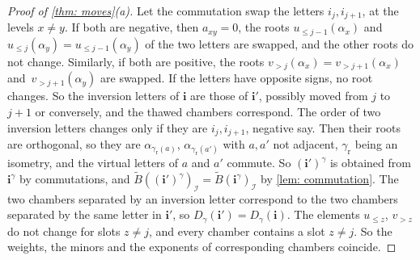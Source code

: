 \documentclass[a4paper]{amsart}
\numberwithin{equation}{section}
\theoremstyle{definition}
\theoremstyle{remark}
\newcommand{\mcI}{\mathcal{I}}
\newcommand{\bfi}{\mathbf{i}}
\newcommand{\tB}{\widetilde{B}}
\newcommand{\rr}{\mathrm{r}}
\begin{document}
\begin{proof}[Proof of \cref{thm: moves}(a)]
  Let the commutation swap the letters $i_j,i_{j+1}$, at the levels $x\neq y$.
  If both are negative, then $a_{xy}=0$, the roots $u_{\le j-1}(\alpha_x)$ and $u_{\le j}(\alpha_y)=u_{\le j-1}(\alpha_y)$ of the two letters are swapped, and the other roots do not change.
  Similarly, if both are positive, the roots $v_{>j}(\alpha_x)=v_{>j+1}(\alpha_x)$ and~$v_{>j+1}(\alpha_y)$ are swapped.
  If the letters have opposite signs, no root changes.
  So the inversion letters of $\bfi$ are those of $\bfi'$, possibly moved from $j$ to $j+1$ or conversely, and the thawed chambers correspond.
  The order of two inversion letters changes only if they are $i_j,i_{j+1}$, negative say.
  Then their roots are orthogonal, so they are $\alpha_{\gamma_{\rr}(a)}$, $\alpha_{\gamma_{\rr}(a')}$ with $a,a'$ not adjacent, $\gamma_{\rr}$ being an isometry, and the virtual letters of $a$ and $a'$ commute.
  So $(\bfi')^\gamma$ is obtained from $\bfi^\gamma$ by commutations, and $\tB((\bfi')^\gamma)_\mcI=\tB(\bfi^\gamma)_\mcI$ by \cref{lem: commutation}.
  The two chambers separated by an inversion letter correspond to the two chambers separated by the same letter in $\bfi'$, so $D_\gamma(\bfi')=D_\gamma(\bfi)$.
  The elements $u_{\le z}$, $v_{>z}$ do not change for slots $z\neq j$, and every chamber contains a slot $z\neq j$.
  So the weights, the minors and the exponents of corresponding chambers coincide.
\end{proof}
\end{document}

